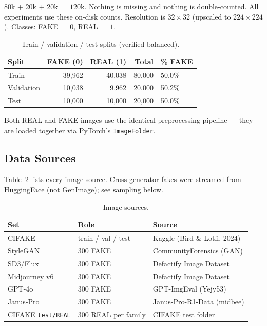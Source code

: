 \documentclass[12pt,a4paper]{article}
\begin{document}
\noindent 80k + 20k + 20k $= 120$k. Nothing is missing and nothing is double-counted. All experiments use these on-disk counts. Resolution is $32\times32$ (upscaled to $224\times224$). Classes: FAKE $=0$, REAL $=1$.

\begin{table}[ht]
\centering
\caption{Train / validation / test splits (verified balanced).}
\label{tab:splits}
\begin{tabular}{lrrrl}
\toprule
\textbf{Split} & \textbf{FAKE (0)} & \textbf{REAL (1)} & \textbf{Total} & \textbf{\% FAKE} \\
\midrule
Train      & 39,962 & 40,038 & 80,000 & 50.0\% \\
Validation & 10,038 &  9,962 & 20,000 & 50.2\% \\
Test       & 10,000 & 10,000 & 20,000 & 50.0\% \\
\bottomrule
\end{tabular}
\end{table}

Both REAL and FAKE images use the identical preprocessing pipeline --- they are loaded together via PyTorch's \texttt{ImageFolder}.

\subsection{Data Sources}

Table~\ref{tab:sources} lists every image source. Cross-generator fakes were streamed from HuggingFace (not GenImage); see sampling below.

\begin{table}[ht]
\centering
\caption{Image sources.}
\label{tab:sources}
\small
\begin{tabular}{p{3.6cm}p{4.2cm}p{6.4cm}}
\toprule
\textbf{Set} & \textbf{Role} & \textbf{Source} \\
\midrule
CIFAKE & train / val / test & Kaggle (Bird \& Lotfi, 2024) \\
StyleGAN & 300 FAKE & CommunityForensics (GAN) \\
SD3/Flux & 300 FAKE & Defactify Image Dataset \\
Midjourney v6 & 300 FAKE & Defactify Image Dataset \\
GPT-4o & 300 FAKE & GPT-ImgEval (Yejy53) \\
Janus-Pro & 300 FAKE & Janus-Pro-R1-Data (midbee) \\
CIFAKE \texttt{test/REAL} & 300 REAL per family & CIFAKE test folder \\
\bottomrule
\end{tabular}
\end{table}
\end{document}
